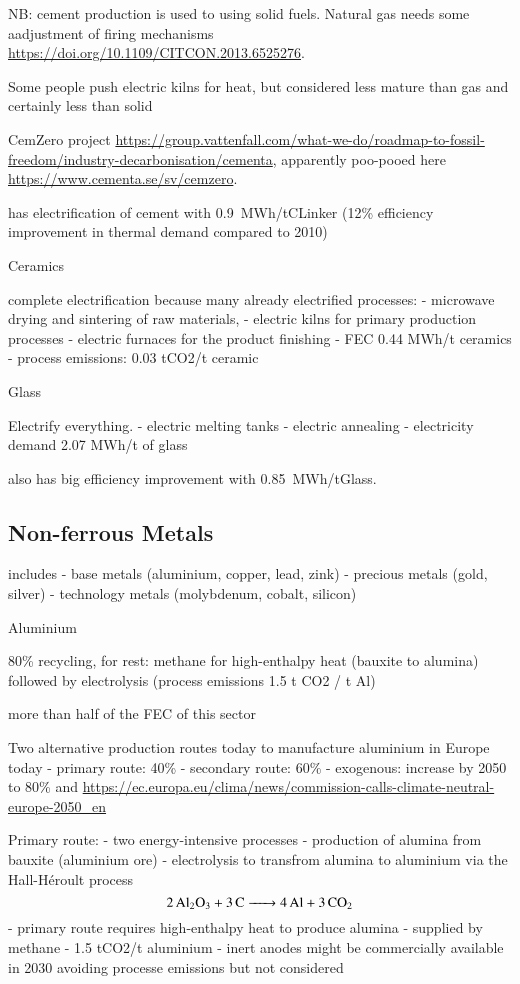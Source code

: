 NB: cement production is used to using solid fuels. Natural gas needs some
aadjustment of firing mechanisms
\url{https://doi.org/10.1109/CITCON.2013.6525276}.

Some people push electric kilns for heat, but considered less mature than gas
and certainly less than solid

CemZero project
\url{https://group.vattenfall.com/what-we-do/roadmap-to-fossil-freedom/industry-decarbonisation/cementa},
apparently poo-pooed here \url{https://www.cementa.se/sv/cemzero}.


 has electrification of cement with 0.9~MWh\el/tCLinker
(12\% efficiency improvement in thermal demand compared to 2010)



Ceramics

complete electrification because many already electrified processes:
- microwave drying and sintering of raw materials,
- electric kilns for primary production processes
- electric furnaces for the product finishing
- FEC 0.44 MWh/t ceramics
- process emissions: 0.03 tCO2/t ceramic


Glass

Electrify everything.
- electric melting tanks
- electric annealing
- electricity demand 2.07 MWh/t of glass 


 also has big efficiency improvement with 0.85~MWh\el/tGlass.

\subsection{Non-ferrous Metals}

includes
- base metals (aluminium, copper, lead, zink)
- precious metals (gold, silver)
- technology metals (molybdenum, cobalt, silicon)

Aluminium

80\% recycling, for rest: methane for high-enthalpy heat (bauxite to alumina) followed by electrolysis (process emissions 1.5 t CO2 / t Al)

more than half of the FEC of this sector

Two alternative production routes today to manufacture aluminium in Europe today
- primary route: 40\%
- secondary route: 60\%
- exogenous: increase by 2050 to 80\%  and \url{https://ec.europa.eu/clima/news/commission-calls-climate-neutral-europe-2050_en}

Primary route:
- two energy-intensive processes
- production of alumina from bauxite (aluminium ore)
- electrolysis to transfrom alumina to aluminium via the Hall-H\'{e}roult process
\begin{equation}
    \ce{2Al2O3 + 3C -> 4Al + 3CO2}
\end{equation}
- primary route requires high-enthalpy heat to produce alumina - supplied by methane
- 1.5 tCO2/t aluminium
- inert anodes might be commercially available in 2030 avoiding processe emissions  but not considered

